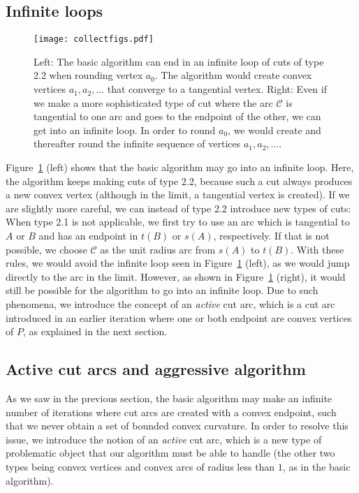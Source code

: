 \documentclass{article}
\newcommand{\PP}{P}
\newcommand{\cut}{\mathcal C}
\newcommand{\start}{s}
\newcommand{\terminal}{t}
\newcommand{\arcA}{A}
\newcommand{\arcB}{B}
\begin{document}
\subsection{Infinite loops}\label{sec:infinite}

\begin{figure}
\centering
\texttt{[image: collectfigs.pdf]}
\caption{Left: The basic algorithm can end in an infinite loop of cuts of type 2.2 when rounding vertex $a_0$.
The algorithm would create convex vertices $a_1,a_2,\ldots$ that converge to a tangential vertex.
Right: Even if we make a more sophisticated type of cut where the arc $\cut$ is tangential to one arc and goes to the endpoint of the other, we can get into an infinite loop.
In order to round $a_0$, we would create and thereafter round the infinite sequence of vertices $a_1,a_2,\ldots$.}
\label{fig:considerations1}
\end{figure}

Figure~\ref{fig:considerations1} (left) shows that the basic algorithm may go into an infinite loop.
Here, the algorithm keeps making cuts of type 2.2, because such a cut always produces a new convex vertex (although in the limit, a tangential vertex is created).
If we are slightly more careful, we can instead of type 2.2 introduce new types of cuts:
When type 2.1 is not applicable, we first try to use an arc which is tangential to $\arcA$ or $\arcB$ and has an endpoint in $\terminal(\arcB)$ or $\start(\arcA)$, respectively.
If that is not possible, we choose $\cut$ as the unit radius arc from $\start(\arcA)$ to $\terminal(\arcB)$.
With these rules, we would avoid the infinite loop seen in Figure~\ref{fig:considerations1} (left), as we would jump directly to the arc in the limit.
However, as shown in Figure~\ref{fig:considerations1} (right), it would still be possible for the algorithm to go into an infinite loop.
Due to such phenomena, we introduce the concept of an \emph{active} cut arc, which is a cut arc introduced in an earlier iteration where one or both endpoint are convex vertices of $\PP$, as explained in the next section.

\subsection{Active cut arcs and aggressive algorithm}\label{sec:active}

As we saw in the previous section, the basic algorithm may make an infinite number of iterations where cut arcs are created with a convex endpoint, such that we never obtain a set of bounded convex curvature.
In order to resolve this issue, we introduce the notion of an \emph{active} cut arc, which is a new type of problematic object that our algorithm must be able to handle (the other two types being convex vertices and convex arcs of radius less than $1$, as in the basic algorithm).
\end{document}

